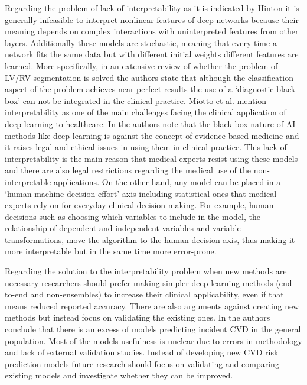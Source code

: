 \documentclass[journal]{IEEEtran}
\begin{document}
Regarding the problem of lack of interpretability as it is indicated by Hinton\cite{hinton2018deep} it is generally infeasible to interpret nonlinear features of deep networks because their meaning depends on complex interactions with uninterpreted features from other layers.
Additionally these models are stochastic, meaning that every time a network fits the same data but with different initial weights different features are learned.
More specifically, in an extensive review\cite{betancur2018deep} of whether the problem of LV/RV segmentation is solved the authors state that although the classification aspect of the problem achieves near perfect results the use of a `diagnostic black box' can not be integrated in the clinical practice.
Miotto et al.\cite{miotto2017deep} mention interpretability as one of the main challenges facing the clinical application of deep learning to healthcare.
In\cite{lee2017deepb} the authors note that the black-box nature of AI methods like deep learning is against the concept of evidence-based medicine and it raises legal and ethical issues in using them in clinical practice.
This lack of interpretability is the main reason that medical experts resist using these models and there are also legal restrictions regarding the medical use of the non-interpretable applications\cite{slomka2017cardiac}.
On the other hand, any model can be placed in a `human-machine decision effort' axis\cite{beam2018big} including statistical ones that medical experts rely on for everyday clinical decision making.
For example, human decisions such as choosing which variables to include in the model, the relationship of dependent and independent variables and variable transformations, move the algorithm to the human decision axis, thus making it more interpretable but in the same time more error-prone.

Regarding the solution to the interpretability problem when new methods are necessary researchers should prefer making simpler deep learning methods (end-to-end and non-ensembles) to increase their clinical applicability, even if that means reduced reported accuracy.
There are also arguments against creating new methods but instead focus on validating the existing ones.
In\cite{damen2016prediction} the authors conclude that there is an excess of models predicting incident CVD in the general population.
Most of the models usefulness is unclear due to errors in methodology and lack of external validation studies.
Instead of developing new CVD risk prediction models future research should focus on validating and comparing existing models and investigate whether they can be improved.
\end{document}
